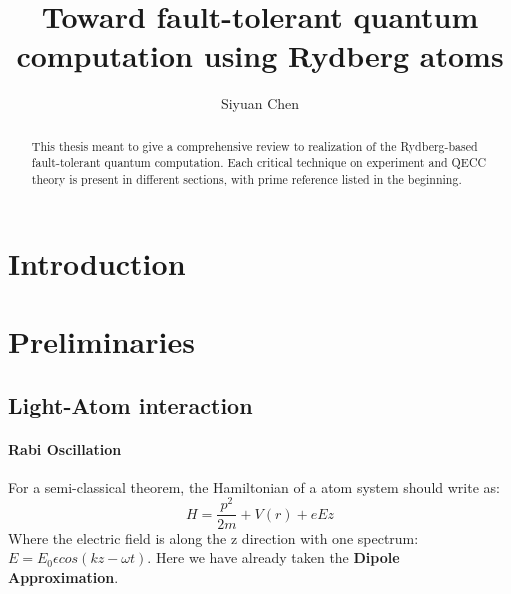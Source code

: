\documentclass[11pt]{article}
\title{Toward fault-tolerant quantum computation using Rydberg atoms}
\begin{document}
\author{Siyuan Chen}
\maketitle

\begin{abstract}
This thesis meant to give a comprehensive review to realization of the Rydberg-based fault-tolerant quantum computation. Each critical technique on experiment and QECC theory is present in different sections, with prime reference listed in the beginning. 
\end{abstract}


\section{Introduction}

\section{Preliminaries}
\subsection{Light-Atom interaction}
\paragraph{Rabi Oscillation}
For a semi-classical theorem, the Hamiltonian of a atom system should write as:
$$
H = \frac{p^2}{2m} + V(r) + e E z
$$
Where the electric field is along the z direction with one spectrum: $E =E_0 \epsilon cos(kz-\omega t)$. Here we have already taken the  \textbf{Dipole Approximation}.
\end{document}
